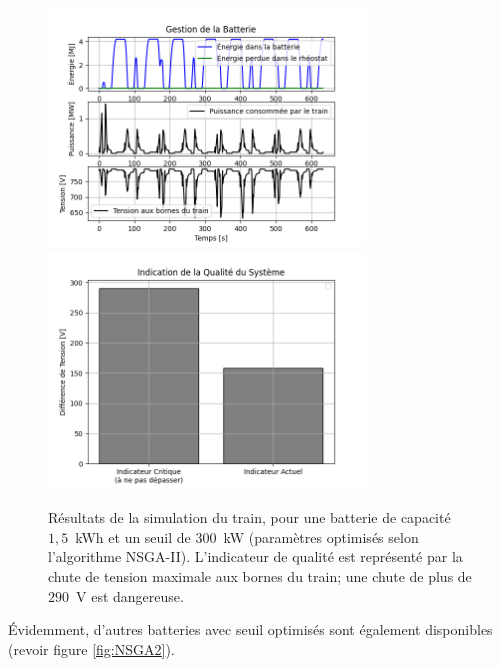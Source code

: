 \documentclass[11pt, a4paper, oneside, portrait]{report}
\begin{document}
        \begin{figure}[H]
            \centering
            \includegraphics[width=0.75\textwidth]{Figures/Bat_F.png}
            \includegraphics[width=0.75\textwidth]{Figures/Qual_F.png}
            \caption{Résultats de la simulation du train, pour une batterie de capacité $1,5$~kWh et un seuil de $300$~kW (paramètres optimisés selon l'algorithme NSGA-II). L'indicateur de qualité est représenté par la chute de tension maximale aux bornes du train; une chute de plus de $290$~V est dangereuse.}
            \label{fig:Con}
        \end{figure}

        Évidemment, d'autres batteries avec seuil optimisés sont également disponibles (revoir figure \ref{fig:NSGA2}).
\end{document}
